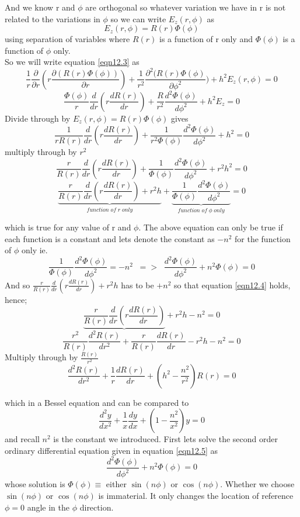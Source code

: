 	  And we know r and $\phi$ are orthogonal so whatever variation we have in r is not related to the variations in $\phi$ so we can write $E_z(r, \phi)$ as
	  $$
	  E_z(r, \phi) = R(r)\Phi(\phi) 
	  $$
	  using separation of variables where $R(r)$ is a function of r only and $\Phi(\phi)$ is a function of $\phi$ only.
	  \\
	  So we will write equation \ref{eqn12.3} as 
	  $$ 
	  \frac{1}{r}\frac{\partial}{\partial r}(r\frac{\partial(R(r)\Phi(\phi))}{\partial r}) + \frac{1}{r^2}\frac{\partial^2 (R(r)\Phi(\phi)}{\partial \phi^2}) + h^2E_z(r,\phi) = 0
	  $$
	  $$
	  \frac{\Phi(\phi)}{r}\frac{d}{dr}\left(r\frac{dR(r)}{dr}\right) + \frac{R}{r^2}\frac{d^2\Phi(\phi)}{d\phi^2} + h^2 E_z = 0
	  $$
	  Divide through by $E_z(r, \phi)=R(r)\Phi(\phi)$ gives 
	  $$
	  \frac{1}{rR(r)}\frac{d}{dr}\left(r\frac{dR(r)}{dr}\right) + \frac{1}{r^2\Phi(\phi)}\frac{d^2\Phi(\phi)}{d\phi^2} + h^2 = 0
	  $$
	  multiply through by $r^2$
	  $$
	  \frac{r}{R(r)}\frac{d}{dr}\left(r\frac{dR(r)}{dr}\right) + \frac{1}{\Phi(\phi)}\frac{d^2\Phi(\phi)}{d\phi^2} + r^2h^2=0
	  $$
	 \begin{equation}
	     \underbrace{\frac{r}{R(r)}\frac{d}{dr}\left(r\frac{dR(r)}{dr}\right)	+ r^2 h}_{function \; of\; r \; only} 
	   	   + \underbrace{\frac{1}{\Phi(\phi)}\frac{d^2\Phi(\phi)}{d\phi^2}}_{function \; of \; \phi \; only} = 0 
	   	   \label{eqn12.4} 
	 \end{equation}
	    
	  which is true for any value of r and $\phi$. The above equation can only be true if each function is a constant and lets denote the constant as $-n^2$ for the function of $\phi$ only ie. 
	  \begin{equation}
	    \frac{1}{\Phi(\phi)}\frac{d^2\Phi(\phi)}{d\phi^2}=-n^2 \; \; => \;\; \frac{d^2\Phi(\phi)}{d\phi^2} + n^2\Phi(\phi) = 0
	    \label{eqn12.5}
	  \end{equation}
	  And so $\frac{r}{R(r)}\frac{d}{dr}(r\frac{dR(r)}{dr}) + r^2h$ has to be $+n^2$ so that equation \ref{eqn12.4} holds, hence;
	  $$
	  \underbrace{\frac{r}{R(r)}\frac{d}{dr}\left(r\frac{dR(r)}{dr}\right)} + r^2h-n^2=0
	  $$
	  $$
	  \frac{r^2}{R(r)}\frac{d^2R(r)}{dr^2} + \frac{r}{R(r)}\frac{dR(r)}{dr} - r^2h-n^2=0
	  $$
	  Multiply through by $\frac{R(r)}{r^2}$
	  \begin{equation}
	   	\frac{d^2R(r)}{dr^2}+\frac{1}{r}\frac{dR(r)}{dr} + (h^2-\frac{n^2}{r^2})R(r)=0
	   	\label{eqn12.6}
	  \end{equation}
	   
	  which in a Bessel equation and can be compared to 
	  $$
	  \frac{d^2y}{dx^2}+\frac{1}{x}\frac{dy}{dx}+\left(1-\frac{n^2}{x^2}\right)y = 0
	  $$
	  and recall $n^2$ is the constant we introduced. First lets solve the second order ordinary differential equation given in equation \ref{eqn12.5} as
	  $$
	  \frac{d^2\Phi(\phi)}{d\phi^2} + n^2\Phi(\phi) = 0
	  $$
	  whose solution is $\Phi(\phi)\equiv $ either $\sin(n\phi)$ or $\cos(n\phi)$. Whether we choose $\sin(n\phi)$ or $\cos(n\phi)$ is immaterial. It only changes the location of reference $\phi=0$ angle in the $\phi$ direction.\\ 
	  
